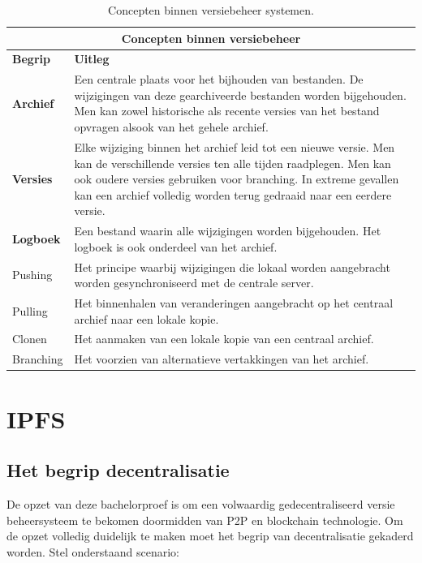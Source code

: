 \begin{table}[h!]
	\centering
	\begin{tabular}{ |p{2cm}|p{12cm}|}
 		\hline
 		\multicolumn{2}{|c|}{\large \textbf{Concepten binnen versiebeheer}} \\
 		\hline
 		\textbf{Begrip}	& \textbf{Uitleg}\\
 		\hline
 		\textbf{Archief} & Een centrale plaats voor het bijhouden van bestanden. De wijzigingen van deze gearchiveerde bestanden worden bijgehouden. Men kan zowel historische als recente versies van het bestand opvragen alsook van het gehele archief.\\
 		\hline
 		\textbf{Versies} & Elke wijziging binnen het archief leid tot een nieuwe versie. Men kan de verschillende versies ten alle tijden raadplegen. Men kan ook oudere versies gebruiken voor branching. In extreme gevallen kan een archief volledig worden terug gedraaid naar een eerdere versie.\\
 		\hline
		\textbf{Logboek} & Een bestand waarin alle wijzigingen worden bijgehouden. Het logboek is ook onderdeel van het archief. \\
		\hline
		Pushing	& Het principe waarbij wijzigingen die lokaal worden aangebracht worden gesynchroniseerd met de centrale server.\\
		\hline
		Pulling & Het binnenhalen van veranderingen aangebracht op het centraal archief naar een lokale kopie.\\
		\hline
		Clonen & Het aanmaken van een lokale kopie van een centraal archief. \\
		Branching & Het voorzien van alternatieve vertakkingen van het archief. \\
		\hline
	\end{tabular}
	\label{tbl_concepts}
	\caption{Concepten binnen versiebeheer systemen.}
\end{table}
\newpage
\section{IPFS}
\label{IPFS}
\subsection{Het begrip decentralisatie}
\label{ipfs_decent}
De opzet van deze bachelorproef is om een volwaardig gedecentraliseerd versie beheersysteem te bekomen doormidden van P2P en blockchain technologie. Om de opzet volledig duidelijk te maken moet het begrip van decentralisatie gekaderd worden. Stel onderstaand scenario:\\

